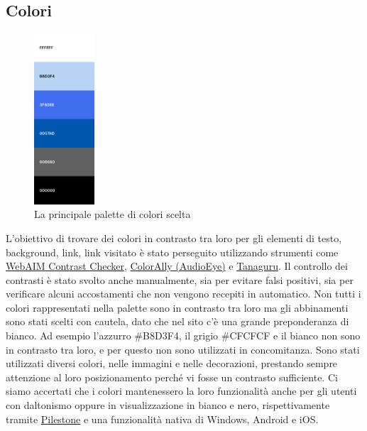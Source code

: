\documentclass{article}
\begin{document}
\subsection{Colori}
\begin{figure}
    \includegraphics[width=0.2\textwidth]{immagini/palette.png}
    \caption{La principale palette di colori scelta}
\end{figure}
L'obiettivo di trovare dei colori in contrasto tra loro per gli elementi di testo, background, link, link visitato è stato perseguito utilizzando strumenti come \href{https://webaim.org/resources/contrastchecker/}{WebAIM Contrast Checker}, \href{https://www.audioeye.com/color-contrast-checker/}{ColorAlly (AudioEye)} e \href{https://contrast-finder.tanaguru.com/}{Tanaguru}. Il controllo dei contrasti è stato svolto anche manualmente, sia per evitare falsi positivi, sia per verificare alcuni accostamenti che non vengono recepiti in automatico. Non tutti i colori rappresentati nella palette sono in contrasto tra loro ma gli abbinamenti sono stati scelti con cautela, dato che nel sito c'è una grande preponderanza di bianco. Ad esempio l'azzurro \#B8D3F4, il grigio \#CFCFCF e il bianco non sono in contrasto tra loro, e per questo non sono utilizzati in concomitanza. Sono stati utilizzati diversi colori, nelle immagini e nelle decorazioni, prestando sempre attenzione al loro posizionamento perché vi fosse un contrasto sufficiente. Ci siamo accertati che i colori mantenessero la loro funzionalità anche per gli utenti con daltonismo oppure in visualizzazione in bianco e nero, rispettivamente tramite \href{https://pilestone.com/pages/color-blindness-simulator-1}{Pilestone} e una funzionalità nativa di Windows, Android e iOS.
\end{document}
